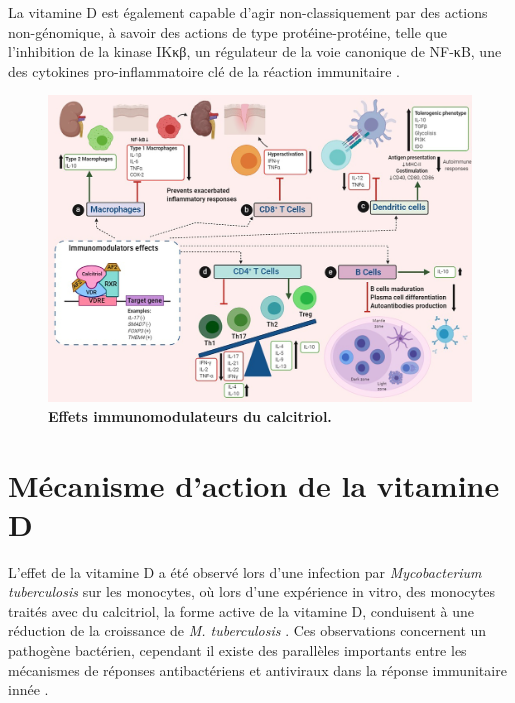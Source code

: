 \documentclass[
  a4paper,
  DIV=11,
  numbers=noendperiod,
  listof=totoc]{scrreprt}
\begin{document}
La vitamine D est également capable d'agir non-classiquement par des
actions non-génomique, à savoir des actions de type protéine-protéine,
telle que l'inhibition de la kinase IKκβ, un régulateur de la voie
canonique de NF-κB, une des cytokines pro-inflammatoire clé de la
réaction immunitaire \autocite{Hii.2016}.

\begin{figure}
\includegraphics{figures/calcitriol-immunomodulatory.jpg} 
\caption[\textbf{Effets immunomodulateurs du calcitriol.}]
{\textbf{Effets immunomodulateurs du calcitriol.} \cite{Meza-Meza.2020}}
\label{fig:immunomod}
\end{figure}

\hypertarget{muxe9canisme-daction-de-la-vitamine-d}{%
\section{Mécanisme d'action de la vitamine
D}\label{muxe9canisme-daction-de-la-vitamine-d}}

L'effet de la vitamine D a été observé lors d'une infection par
\emph{Mycobacterium tuberculosis} sur les monocytes, où lors d'une
expérience in vitro, des monocytes traités avec du calcitriol, la forme
active de la vitamine D, conduisent à une réduction de la croissance de
\emph{M. tuberculosis} \autocite{Hewison.2011}. Ces observations
concernent un pathogène bactérien, cependant il existe des parallèles
importants entre les mécanismes de réponses antibactériens et antiviraux
dans la réponse immunitaire innée \autocite{White.2022}.
\end{document}
